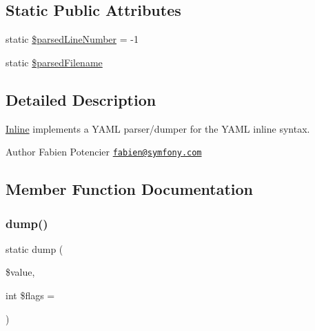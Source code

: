 \subsection*{Static Public Attributes}
\begin{DoxyCompactItemize}
\item 
static \mbox{\hyperlink{class_symfony_1_1_component_1_1_yaml_1_1_inline_ad040771e87123cbd0a7ab1c8a6cd1fc2}{\$parsed\+Line\+Number}} = -\/1
\item 
static \mbox{\hyperlink{class_symfony_1_1_component_1_1_yaml_1_1_inline_adc2671a271a0fb7d73dcb421d57a1ff9}{\$parsed\+Filename}}
\end{DoxyCompactItemize}


\subsection{Detailed Description}
\mbox{\hyperlink{class_symfony_1_1_component_1_1_yaml_1_1_inline}{Inline}} implements a Y\+A\+ML parser/dumper for the Y\+A\+ML inline syntax.

\begin{DoxyAuthor}{Author}
Fabien Potencier \href{mailto:fabien@symfony.com}{\tt fabien@symfony.\+com} 
\end{DoxyAuthor}


\subsection{Member Function Documentation}
\mbox{\label{class_symfony_1_1_component_1_1_yaml_1_1_inline_a2c5b5f72b99556d86f39d7ab571c9704}} 
\subsubsection{\texorpdfstring{dump()}{dump()}}
{\footnotesize\ttfamily static dump (\begin{DoxyParamCaption}\item[{}]{\$value,  }\item[{int}]{\$flags = {} }\end{DoxyParamCaption})\hspace{0.3cm}{\ttfamily [static]}}

